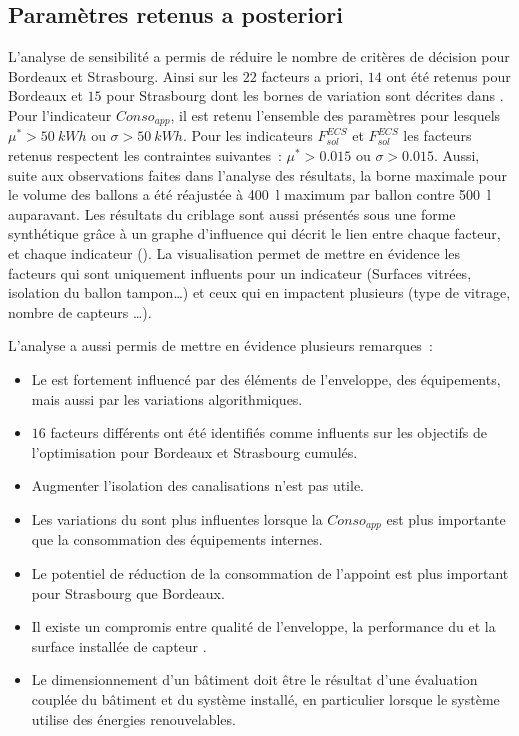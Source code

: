 \subsection{Paramètres retenus a posteriori} %
\label{sub:parametres_retenus_a_posteriori}
L’analyse de sensibilité a permis de réduire le nombre de critères de décision
pour Bordeaux et Strasbourg. Ainsi sur les $22$ facteurs a priori, $14$ ont été retenus
pour Bordeaux et $15$ pour Strasbourg dont les bornes de variation sont décrites
dans . Pour l’indicateur $Conso_{app}$, il est retenu
l’ensemble des paramètres pour lesquels $\mu^{*} > \SI{50}{kWh}$ ou $\sigma > \SI{50}{kWh}$. Pour
les indicateurs $F_{sol}^{ECS}$ et $F_{sol}^{ECS}$ les facteurs retenus respectent
les contraintes suivantes~: $\mu^{*} > 0.015$ ou $\sigma > 0.015$.
Aussi, suite aux observations faites dans l’analyse des résultats, la borne maximale pour le volume des
ballons a été réajustée à \SI{400}{\litre} maximum par ballon contre \SI{500}{\litre}
auparavant.
Les résultats du criblage sont aussi présentés sous une forme synthétique grâce à un
graphe d’influence qui décrit le lien entre chaque facteur, et chaque indicateur
(). La visualisation permet de mettre en évidence
les facteurs qui sont uniquement influents pour un indicateur (Surfaces vitrées, isolation du ballon tampon\dots) et
ceux qui en impactent plusieurs (type de vitrage, nombre de capteurs \dots).

L’analyse a aussi permis de mettre en évidence plusieurs remarques~:
\begin{itemize}
  \item Le  est fortement influencé par des éléments de l’enveloppe, des équipements,
        mais aussi par les variations algorithmiques.
  \item $16$ facteurs différents ont été identifiés comme influents sur les objectifs de
        l’optimisation pour Bordeaux et Strasbourg cumulés.
  \item Augmenter l’isolation des canalisations n’est pas utile.
  \item Les variations du  sont plus influentes lorsque la $Conso_{app}$
        est plus importante que la consommation des équipements internes.
  \item Le potentiel de réduction de la consommation de l’appoint est plus important
        pour Strasbourg que Bordeaux.
  \item Il existe un compromis entre qualité de l’enveloppe, la performance du 
        et la surface installée de capteur .
  \item Le dimensionnement d’un bâtiment doit être le résultat d’une évaluation
        couplée du bâtiment et du système installé, en particulier lorsque le système
        utilise des énergies renouvelables.
\end{itemize}

